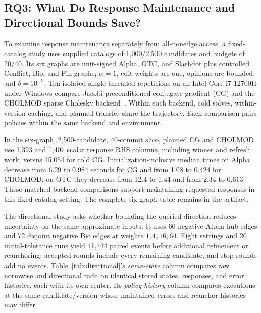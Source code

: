 \subsection{RQ3: What Do Response Maintenance and Directional Bounds Save?}
To examine response maintenance separately from all-nonedge access, a fixed-catalog study uses supplied catalogs of 1,000/2,500 candidates and budgets of 20/40. Its six graphs are unit-signed Alpha, OTC, and Slashdot plus controlled Conflict, Bio, and Fin graphs; $\alpha=1$, edit weights are one, opinions are bounded, and $\delta=10^{-9}$. Ten isolated single-threaded repetitions on an Intel Core i7-12700H under Windows compare Jacobi-preconditioned conjugate gradient (CG) and the CHOLMOD sparse Cholesky backend~\cite{chen2008cholmod,virtanen2020scipy}. Within each backend, cold solves, within-version caching, and planned transfer share the trajectory. Each comparison pairs policies within the same backend and environment.

In the six-graph, 2,500-candidate, 40-commit slice, planned CG and CHOLMOD use 1,393 and 1,407 scalar response RHS columns, including winner and refresh work, versus 15,054 for cold CG. Initialization-inclusive median times on Alpha decrease from 6.29 to 0.984 seconds for CG and from 1.08 to 0.424 for CHOLMOD; on OTC they decrease from 12.4 to 1.44 and from 2.34 to 0.613. These matched-backend comparisons support maintaining requested responses in this fixed-catalog setting. The complete six-graph table remains in the artifact.

The directional study asks whether bounding the queried direction reduces uncertainty on the same approximate inputs. It uses 60 negative Alpha hub edges and 72 disjoint negative Bio edges at weights $1,4,16,64$. Eight settings and 20 initial-tolerance runs yield 41,744 paired events before additional refinement or reanchoring; accepted rounds include every remaining candidate, and stop rounds add no events. Table~\ref{tab:directional}'s \emph{same-state} column compares raw normwise and directional radii on identical stored states, responses, and error histories, each with its own center. Its \emph{policy-history} column compares executions at the same candidate/version whose maintained errors and reanchor histories may differ.

